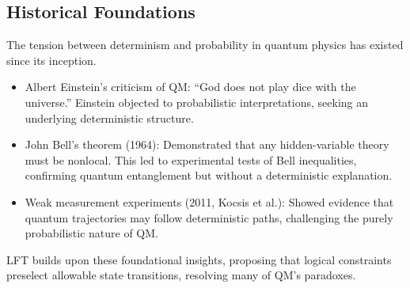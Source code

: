 \subsection{Historical Foundations}
The tension between determinism and probability in quantum physics has existed since its inception. 
\begin{itemize}
    \item Albert Einstein’s criticism of QM: “God does not play dice with the universe.” Einstein objected to probabilistic interpretations, seeking an underlying deterministic structure.
    \item John Bell’s theorem (1964): Demonstrated that any hidden-variable theory must be nonlocal. This led to experimental tests of Bell inequalities, confirming quantum entanglement but without a deterministic explanation.
    \item Weak measurement experiments (2011, Kocsis et al.): Showed evidence that quantum trajectories may follow deterministic paths, challenging the purely probabilistic nature of QM.
\end{itemize}
LFT builds upon these foundational insights, proposing that logical constraints preselect allowable state transitions, resolving many of QM’s paradoxes.

